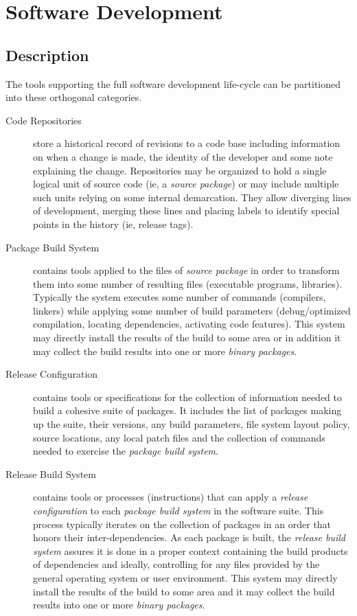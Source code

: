 \section{Software Development}


\subsection{Description}
\label{sec:swdevpartitions}

The tools supporting the full software development life-cycle can be
partitioned into these orthogonal categories.

\begin{description}
\item[Code Repositories] store a historical record of revisions to a
  code base including information on when a change is made, the
  identity of the developer and some note explaining the change.
  Repositories may be organized to hold a single logical unit of
  source code (ie, a \textit{source package}) or may include multiple
  such units relying on some internal demarcation.  They allow
  diverging lines of development, merging these lines and placing
  labels to identify special points in the history (ie, release tags).

\item[Package Build System] contains tools applied to the files of
  \textit{source package} in order to transform them into some number
  of resulting files (executable programs, libraries).  Typically the
  system executes some number of commands (compilers, linkers) while
  applying some number of build parameters (debug/optimized
  compilation, locating dependencies, activating code features).  This
  system may directly install the results of the build to some area or
  in addition it may collect the build results into one or more
  \textit{binary packages}.

\item[Release Configuration] contains tools or specifications for the
  collection of information needed to build a cohesive suite of
  packages.  It includes the list of packages making up the suite,
  their versions, any build parameters, file system layout policy,
  source locations, any local patch files and the collection of
  commands needed to exercise the \textit{package build system}. 

\item[Release Build System] contains tools or processes (instructions)
  that can apply a \textit{release configuration} to each
  \textit{package build system} in the software suite.  This process
  typically iterates on the collection of packages in an order that
  honors their inter-dependencies.  As each package is built, the
  \textit{release build system} assures it is done in a proper context
  containing the build products of dependencies and ideally,
  controlling for any files provided by the general operating system
  or user environment. This system may directly install the results of
  the build to some area and it may collect the build results into one
  or more \textit{binary packages}.


\end{description}
